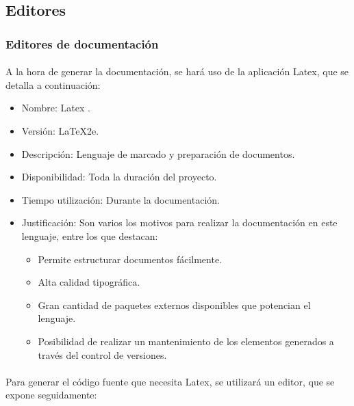    \subsection{Editores}

      \subsubsection{Editores de documentación}

      \paragraph{}A la hora de generar la documentación, se hará uso de la
      aplicación Latex, que se detalla a continuación:

      \begin{itemize}
         \item Nombre: Latex \cite{latex}.
         \item Versión: LaTeX2e.
         \item Descripción: Lenguaje de marcado y preparación de documentos.
         \item Disponibilidad: Toda la duración del proyecto.
         \item Tiempo utilización: Durante la documentación.
         \item Justificación: Son varios los motivos para realizar la
         documentación en este lenguaje, entre los que destacan:
            \begin{itemize}
               \item Permite estructurar documentos fácilmente.
               \item Alta calidad tipográfica.
               \item Gran cantidad de paquetes externos disponibles que
               potencian el lenguaje.
               \item Posibilidad de realizar un mantenimiento de los elementos
               generados a través del control de versiones.
            \end{itemize}
      \end{itemize}

      \paragraph{}Para generar el código fuente que necesita Latex, se utilizará
      un editor, que se expone seguidamente:


